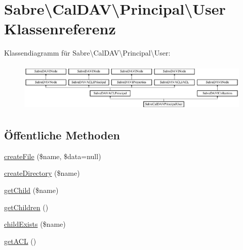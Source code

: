 \hypertarget{class_sabre_1_1_cal_d_a_v_1_1_principal_1_1_user}{}\section{Sabre\textbackslash{}Cal\+D\+AV\textbackslash{}Principal\textbackslash{}User Klassenreferenz}
\label{class_sabre_1_1_cal_d_a_v_1_1_principal_1_1_user}
Klassendiagramm für Sabre\textbackslash{}Cal\+D\+AV\textbackslash{}Principal\textbackslash{}User\+:\begin{figure}[H]
\begin{center}
\leavevmode
\includegraphics[height=2.382979cm]{class_sabre_1_1_cal_d_a_v_1_1_principal_1_1_user}
\end{center}
\end{figure}
\subsection*{Öffentliche Methoden}
\begin{DoxyCompactItemize}
\item 
\mbox{\hyperlink{class_sabre_1_1_cal_d_a_v_1_1_principal_1_1_user_a7ae49dc82db4732ad0aecc1520a1d909}{create\+File}} (\$name, \$data=null)
\item 
\mbox{\hyperlink{class_sabre_1_1_cal_d_a_v_1_1_principal_1_1_user_a333444a54f6dca549deb3013bb15c191}{create\+Directory}} (\$name)
\item 
\mbox{\hyperlink{class_sabre_1_1_cal_d_a_v_1_1_principal_1_1_user_a8cfa81741e17a5489ea7c33306407d72}{get\+Child}} (\$name)
\item 
\mbox{\hyperlink{class_sabre_1_1_cal_d_a_v_1_1_principal_1_1_user_a98c22dc6958f352eadf92c960bd3bf19}{get\+Children}} ()
\item 
\mbox{\hyperlink{class_sabre_1_1_cal_d_a_v_1_1_principal_1_1_user_a4a3f312b08c5c80ff35fdf00ae8c92f8}{child\+Exists}} (\$name)
\item 
\mbox{\hyperlink{class_sabre_1_1_cal_d_a_v_1_1_principal_1_1_user_ac9de38316e6e254deb3a844a0d3c7d84}{get\+A\+CL}} ()
\end{DoxyCompactItemize}
